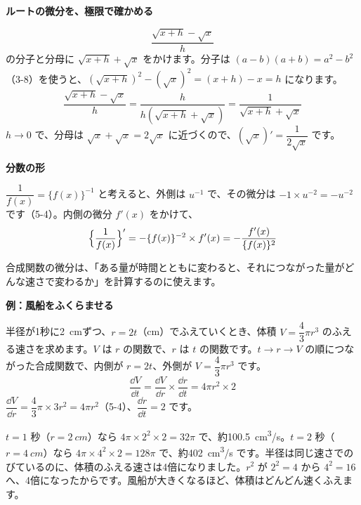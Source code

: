 \begin{motto}[4]
\textbf{ルートの微分を、極限で確かめる}\par
\[ \frac{\sqrt{x+h}-\sqrt{x}}{h} \]
\noindent の分子と分母に $\sqrt{x+h}+\sqrt{x}$ をかけます。分子は $(a-b)(a+b)=a^2-b^2$（3-8）を使うと、$(\sqrt{x+h})^2-(\sqrt{x})^2=(x+h)-x=h$ になります。
\[ \frac{\sqrt{x+h}-\sqrt{x}}{h}=\frac{h}{h(\sqrt{x+h}+\sqrt{x})}=\frac{1}{\sqrt{x+h}+\sqrt{x}} \]
$h\to0$ で、分母は $\sqrt{x}+\sqrt{x}=2\sqrt{x}$ に近づくので、$(\sqrt{x})'=\dfrac{1}{2\sqrt{x}}$ です。
\end{motto}

\noindent\textbf{分数の形}\par
\noindent $\dfrac{1}{f(x)}=\{f(x)\}^{-1}$ と考えると、外側は $u^{-1}$ で、その微分は $-1\times u^{-2}=-u^{-2}$ です（5-4）。内側の微分 $f'(x)$ をかけて、
\[ \Bigl\{\frac{1}{f(x)}\Bigr\}'=-\{f(x)\}^{-2}\times f'(x)=-\frac{f'(x)}{\{f(x)\}^2} \]


\leavevmode\label{bk:5-6:rensa}合成関数の微分は、「ある量が時間とともに変わると、それにつながった量がどんな速さで変わるか」を計算するのに使えます。

\noindent\begin{minipage}[c]{0.66\linewidth}
\textbf{例：風船をふくらませる}\par
半径が1秒に\qty{2}{cm}ずつ、$r=2t$（cm）でふえていくとき、体積 $V=\dfrac{4}{3}\pi r^3$ のふえる速さを求めます。$V$ は $r$ の関数で、$r$ は $t$ の関数です。$t\to r\to V$ の順につながった合成関数で、内側が $r=2t$、外側が $V=\dfrac{4}{3}\pi r^3$ です。
\[ \frac{\dd V}{\dd t}=\frac{\dd V}{\dd r}\times\frac{\dd r}{\dd t}=4\pi r^2\times2 \]
$\dfrac{\dd V}{\dd r}=\dfrac{4}{3}\pi\times3r^2=4\pi r^2$（5-4）、$\dfrac{\dd r}{\dd t}=2$ です。
\end{minipage}\hfill
\begin{minipage}[c]{0.3\linewidth}\centering
{}
\end{minipage}

\vspace{2pt}
$t=1$ 秒（$r=\qty{2}{cm}$）なら $4\pi\times2^2\times2=32\pi$ で、約\qty{100.5}{cm^3/s}。$t=2$ 秒（$r=\qty{4}{cm}$）なら $4\pi\times4^2\times2=128\pi$ で、約\qty{402}{cm^3/s} です。半径は同じ速さでのびているのに、体積のふえる速さは4倍になりました。$r^2$ が $2^2=4$ から $4^2=16$ へ、4倍になったからです。風船が大きくなるほど、体積はどんどん速くふえます。

